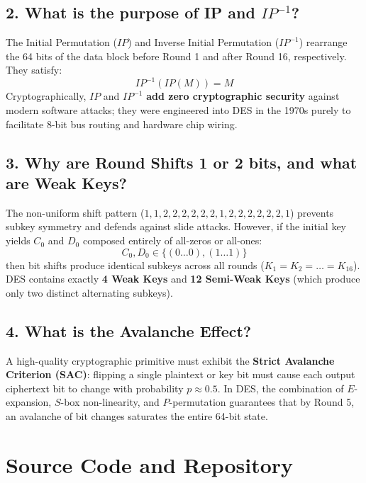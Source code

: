 \documentclass[12pt,a4paper]{article}
\begin{document}
\subsection{2. What is the purpose of IP and $IP^{-1}$?}
The Initial Permutation ($IP$) and Inverse Initial Permutation ($IP^{-1}$) rearrange the 64 bits of the data block before Round 1 and after Round 16, respectively. They satisfy:
\begin{equation}
    IP^{-1}(IP(M)) = M
\end{equation}
Cryptographically, $IP$ and $IP^{-1}$ \textbf{add zero cryptographic security} against modern software attacks; they were engineered into DES in the 1970s purely to facilitate 8-bit bus routing and hardware chip wiring.

\subsection{3. Why are Round Shifts 1 or 2 bits, and what are Weak Keys?}
The non-uniform shift pattern ($1, 1, 2, 2, 2, 2, 2, 2, 1, 2, 2, 2, 2, 2, 2, 1$) prevents subkey symmetry and defends against slide attacks. 
However, if the initial key yields $C_0$ and $D_0$ composed entirely of all-zeros or all-ones:
\begin{equation}
    C_0, D_0 \in \{(0\dots0), (1\dots1)\}
\end{equation}
then bit shifts produce identical subkeys across all rounds ($K_1 = K_2 = \dots = K_{16}$). DES contains exactly \textbf{4 Weak Keys} and \textbf{12 Semi-Weak Keys} (which produce only two distinct alternating subkeys).

\subsection{4. What is the Avalanche Effect?}
A high-quality cryptographic primitive must exhibit the \textbf{Strict Avalanche Criterion (SAC)}: flipping a single plaintext or key bit must cause each output ciphertext bit to change with probability $p \approx 0.5$. In DES, the combination of $E$-expansion, $S$-box non-linearity, and $P$-permutation guarantees that by Round 5, an avalanche of bit changes saturates the entire 64-bit state.

\section{Source Code and Repository}
\end{document}
